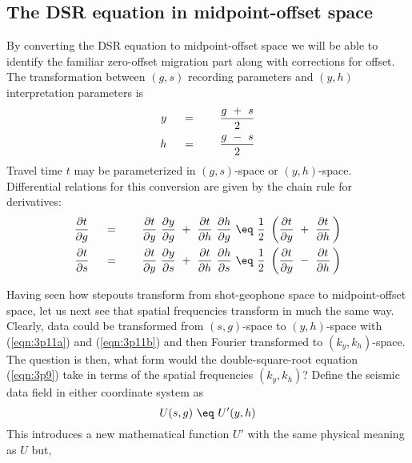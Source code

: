 \subsection{The DSR equation in midpoint-offset space}
\par
By converting the DSR equation to midpoint-offset space
we will be able to identify the familiar zero-offset migration part
along with corrections for offset.
The transformation between  $(g,s)$  recording parameters
and  $(y,h)$  interpretation parameters is
\begin{eqnarray}
y \ \ \ \ &=&\ \ \ \  { g \ +\  s   \over 2 }
\label{eqn:3p11a}
\\
h \ \ \ \ &=&\ \ \ \  { g \ -\  s   \over 2 }
\label{eqn:3p11b}
\end{eqnarray}
Travel time  $t$  may be parameterized in $(g,s)$-space or $(y,h)$-space.
Differential relations for this 
conversion are given by the chain rule for derivatives:
\begin{eqnarray}
{\partial t  \over \partial g} \ \ \ \ &=&\ \ \ \ 
{\partial t  \over \partial y} \  {\partial y  \over \partial g} \ +\ 
{\partial t  \over \partial h} \  {\partial h   \over \partial g} \  \eq \ 
{1 \over 2 }\   \left( {\partial t  \over \partial y} \ +\ 
{\partial t  \over \partial h } \, \right)
\label{eqn:3p12a}
\\
{\partial t  \over \partial s} \ \ \ \ &=&\ \ \ \ 
{\partial t  \over \partial y} \  {\partial y  \over \partial s} \ +\ 
{\partial t  \over \partial h} \  {\partial h   \over \partial s} \  \eq \ 
{1 \over 2 }\   \left( {\partial t  \over \partial y} \ -\ 
{\partial t  \over \partial h } \, \right)
\label{eqn:3p12b}
\end{eqnarray}
\par
Having seen how stepouts transform from shot-geophone space
to midpoint-offset space,
let us next see that spatial frequencies transform in much the same way.
Clearly, data could be transformed from $(s,g)$-space
to $(y,h)$-space with (\ref{eqn:3p11a}) and (\ref{eqn:3p11b})
and then Fourier transformed to $ ( k_y , k_h ) $-space.
The question is then,
what form would the double-square-root equation (\ref{eqn:3p9})
take in terms of the spatial frequencies  $ ( k_y , k_h ) $?
Define the seismic data field in either coordinate system as
\begin{equation}
U ( s, g )\  \eq \ U'  ( y , h )
\label{eqn:3p13}
\end{equation}
This introduces a new mathematical function  $ U'  $  with the same
physical meaning as  $U$  but,
